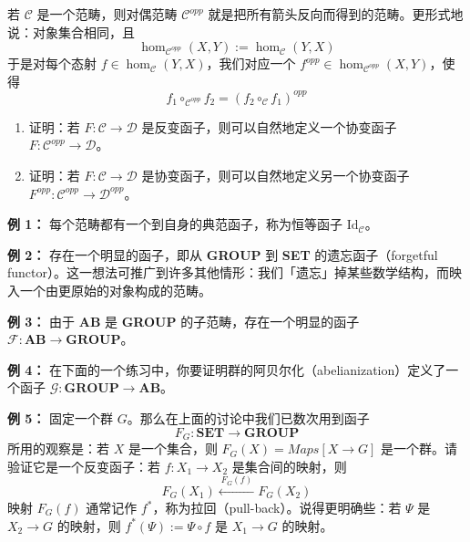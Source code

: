 若 $\mathcal{C}$ 是一个范畴，则对偶范畴 $\mathcal{C}^{opp}$ 就是把所有箭头反向而得到的范畴。更形式地说：对象集合相同，且
\begin{equation}
\hom_{\mathcal{C}^{opp}}(X,Y):=\hom_{\mathcal{C}}(Y,X)
\tag{K.12}
\label{eq:K.12}
\end{equation}
于是对每个态射 $f\in\hom_{\mathcal{C}}(Y,X)$，我们对应一个 $f^{opp}\in\hom_{\mathcal{C}^{opp}}(X,Y)$，使得
\begin{equation}
f_1\circ_{\mathcal{C}^{opp}}f_2=(f_2\circ_{\mathcal{C}}f_1)^{opp}
\tag{K.13}
\label{eq:K.13}
\end{equation}

\begin{enumerate}[label=\alph*.)]
  \item 证明：若 $F:\mathcal{C}\to\mathcal{D}$ 是反变函子，则可以自然地定义一个协变函子 $F:\mathcal{C}^{opp}\to\mathcal{D}$。
  \item 证明：若 $F:\mathcal{C}\to\mathcal{D}$ 是协变函子，则可以自然地定义另一个协变函子 $F^{opp}:\mathcal{C}^{opp}\to\mathcal{D}^{opp}$。
\end{enumerate}

\textbf{例 1：} 每个范畴都有一个到自身的典范函子，称为恒等函子 $\mathrm{Id}_{\mathcal{C}}$。

\textbf{例 2：} 存在一个明显的函子，即从 \textbf{GROUP} 到 \textbf{SET} 的遗忘函子（forgetful functor）。这一想法可推广到许多其他情形：我们「遗忘」掉某些数学结构，而映入一个由更原始的对象构成的范畴。

\textbf{例 3：} 由于 \textbf{AB} 是 \textbf{GROUP} 的子范畴，存在一个明显的函子 $\mathcal{F}:\textbf{AB}\to\textbf{GROUP}$。

\textbf{例 4：} 在下面的一个练习中，你要证明群的阿贝尔化（abelianization）定义了一个函子 $\mathcal{G}:\textbf{GROUP}\to\textbf{AB}$。

\textbf{例 5：} 固定一个群 $G$。那么在上面的讨论中我们已数次用到函子
\begin{equation}
F_G:\textbf{SET}\to\textbf{GROUP}
\tag{K.14}
\label{eq:K.14}
\end{equation}
所用的观察是：若 $X$ 是一个集合，则 $F_G(X)=\mathit{Maps}[X\to G]$ 是一个群。请验证它是一个反变函子：若 $f:X_1\to X_2$ 是集合间的映射，则
\begin{equation}
F_G(X_1)\xleftarrow{\ F_G(f)\ }F_G(X_2)
\tag{K.15}
\label{eq:K.15}
\end{equation}
映射 $F_G(f)$ 通常记作 $f^*$，称为拉回（pull-back）。说得更明确些：若 $\Psi$ 是 $X_2\to G$ 的映射，则 $f^*(\Psi):=\Psi\circ f$ 是 $X_1\to G$ 的映射。

